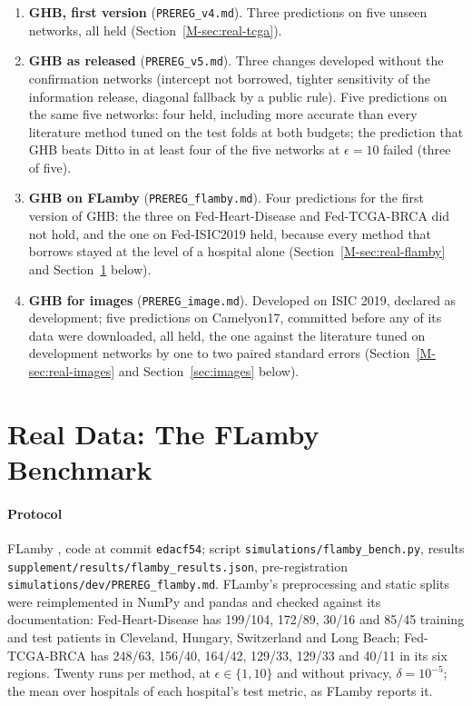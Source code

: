 \documentclass[acmsmall,screen,nonacm]{acmart}
\theoremstyle{acmdefinition}
\begin{document}
\begin{enumerate}[leftmargin=*]
\item \textbf{GHB, first version} (\texttt{PREREG\_v4.md}). Three predictions on five unseen networks, all held (Section~\ref{M-sec:real-tcga}).
\item \textbf{GHB as released} (\texttt{PREREG\_v5.md}). Three changes developed without the confirmation networks (intercept not borrowed, tighter sensitivity of the information release, diagonal fallback by a public rule). Five predictions on the same five networks: four held, including more accurate than every literature method tuned on the test folds at both budgets; the prediction that GHB beats Ditto in at least four of the five networks at $\epsilon=10$ failed (three of five).
\item \textbf{GHB on FLamby} (\texttt{PREREG\_flamby.md}). Four predictions for the first version of GHB: the three on Fed-Heart-Disease and Fed-TCGA-BRCA did not hold, and the one on Fed-ISIC2019 held, because every method that borrows stayed at the level of a hospital alone (Section~\ref{M-sec:real-flamby} and Section~\ref{sec:flamby} below).
\item \textbf{GHB for images} (\texttt{PREREG\_image.md}). Developed on ISIC 2019, declared as development; five predictions on Camelyon17, committed before any of its data were downloaded, all held, the one against the literature tuned on development networks by one to two paired standard errors (Section~\ref{M-sec:real-images} and Section~\ref{sec:images} below).
\end{enumerate}

\section{Real Data: The FLamby Benchmark}\label{sec:flamby}

\paragraph{Protocol} FLamby \cite{ogierduterrail2022flamby}, code at commit \texttt{edacf54}; script \texttt{simulations/flamby\_bench.py}, results \texttt{supplement/results/flamby\_results.json}, pre-registration \texttt{simulations/dev/PREREG\_flamby.md}. FLamby's preprocessing and static splits were reimplemented in NumPy and pandas and checked against its documentation: Fed-Heart-Disease has 199/104, 172/89, 30/16 and 85/45 training and test patients in Cleveland, Hungary, Switzerland and Long Beach; Fed-TCGA-BRCA has 248/63, 156/40, 164/42, 129/33, 129/33 and 40/11 in its six regions. Twenty runs per method, at $\epsilon\in\{1,10\}$ and without privacy, $\delta=10^{-5}$; the mean over hospitals of each hospital's test metric, as FLamby reports it.
\end{document}

